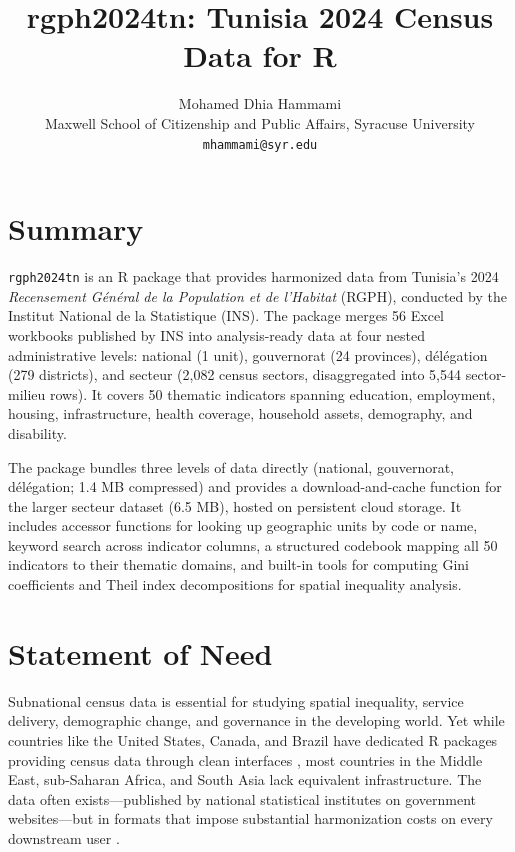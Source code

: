 \documentclass[12pt]{article}
\title{\textbf{rgph2024tn: Tunisia 2024 Census Data for R}}
\author{Mohamed Dhia Hammami\\
\small Maxwell School of Citizenship and Public Affairs, Syracuse University\\
\small \texttt{mhammami@syr.edu}}
\date{}
\begin{document}
\maketitle

\section*{Summary}

\texttt{rgph2024tn} is an R package that provides harmonized data from Tunisia's 2024 \textit{Recensement G\'{e}n\'{e}ral de la Population et de l'Habitat} (RGPH), conducted by the Institut National de la Statistique (INS). The package merges 56 Excel workbooks published by INS into analysis-ready data at four nested administrative levels: national (1 unit), gouvernorat (24 provinces), d\'{e}l\'{e}gation (279 districts), and secteur (2,082 census sectors, disaggregated into 5,544 sector-milieu rows). It covers 50 thematic indicators spanning education, employment, housing, infrastructure, health coverage, household assets, demography, and disability.

The package bundles three levels of data directly (national, gouvernorat, d\'{e}l\'{e}gation; 1.4 MB compressed) and provides a download-and-cache function for the larger secteur dataset (6.5 MB), hosted on persistent cloud storage. It includes accessor functions for looking up geographic units by code or name, keyword search across indicator columns, a structured codebook mapping all 50 indicators to their thematic domains, and built-in tools for computing Gini coefficients and Theil index decompositions for spatial inequality analysis.


\section*{Statement of Need}

Subnational census data is essential for studying spatial inequality, service delivery, demographic change, and governance in the developing world. Yet while countries like the United States, Canada, and Brazil have dedicated R packages providing census data through clean interfaces \citep{walker2023tidycensus}, most countries in the Middle East, sub-Saharan Africa, and South Asia lack equivalent infrastructure. The data often exists---published by national statistical institutes on government websites---but in formats that impose substantial harmonization costs on every downstream user \citep{jerven2013poor, devarajan2013africa}.
\end{document}
